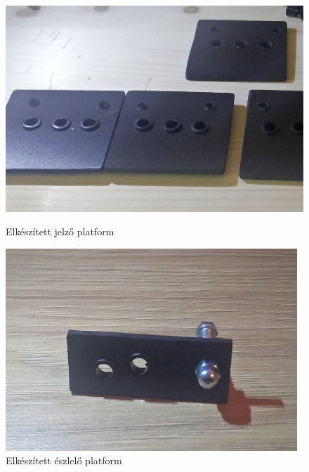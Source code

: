 \documentclass[a4paper,12pt]{article}
\begin{document}
\begin{figure}[htp]
    \centering
    \begin{minipage}{0.45\textwidth}
        \centering
        \includegraphics[width=\textwidth]{images/signalplatform.png}
        \caption[Jelző platform]{Elkészített jelző platform}
		\label{fig:signalplatform}
    \end{minipage}\hfill
    \begin{minipage}{0.45\textwidth}
        \centering
        \includegraphics[width=\textwidth]{images/vacancyplatform.png}
        \caption[Észlelő platform]{Elkészített észlelő platform}
		\label{fig:vacancyplatform}
    \end{minipage}
\end{figure}
\end{document}
